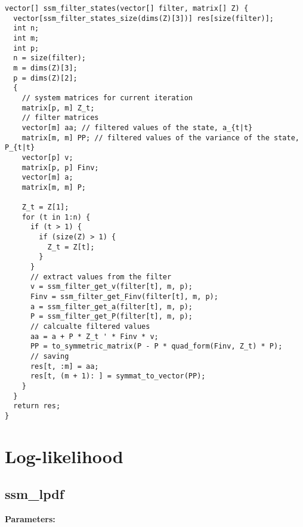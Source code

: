 \documentclass[]{book}
\begin{document}
\begin{verbatim}
vector[] ssm_filter_states(vector[] filter, matrix[] Z) {
  vector[ssm_filter_states_size(dims(Z)[3])] res[size(filter)];
  int n;
  int m;
  int p;
  n = size(filter);
  m = dims(Z)[3];
  p = dims(Z)[2];
  {
    // system matrices for current iteration
    matrix[p, m] Z_t;
    // filter matrices
    vector[m] aa; // filtered values of the state, a_{t|t}
    matrix[m, m] PP; // filtered values of the variance of the state, P_{t|t}
    vector[p] v;
    matrix[p, p] Finv;
    vector[m] a;
    matrix[m, m] P;

    Z_t = Z[1];
    for (t in 1:n) {
      if (t > 1) {
        if (size(Z) > 1) {
          Z_t = Z[t];
        }
      }
      // extract values from the filter
      v = ssm_filter_get_v(filter[t], m, p);
      Finv = ssm_filter_get_Finv(filter[t], m, p);
      a = ssm_filter_get_a(filter[t], m, p);
      P = ssm_filter_get_P(filter[t], m, p);
      // calcualte filtered values
      aa = a + P * Z_t ' * Finv * v;
      PP = to_symmetric_matrix(P - P * quad_form(Finv, Z_t) * P);
      // saving
      res[t, :m] = aa;
      res[t, (m + 1): ] = symmat_to_vector(PP);
    }
  }
  return res;
}
\end{verbatim}

\section{Log-likelihood}\label{log-likelihood}

\subsection{ssm\_lpdf}\label{ssmux5flpdf}

\textbf{Parameters:}
\end{document}
